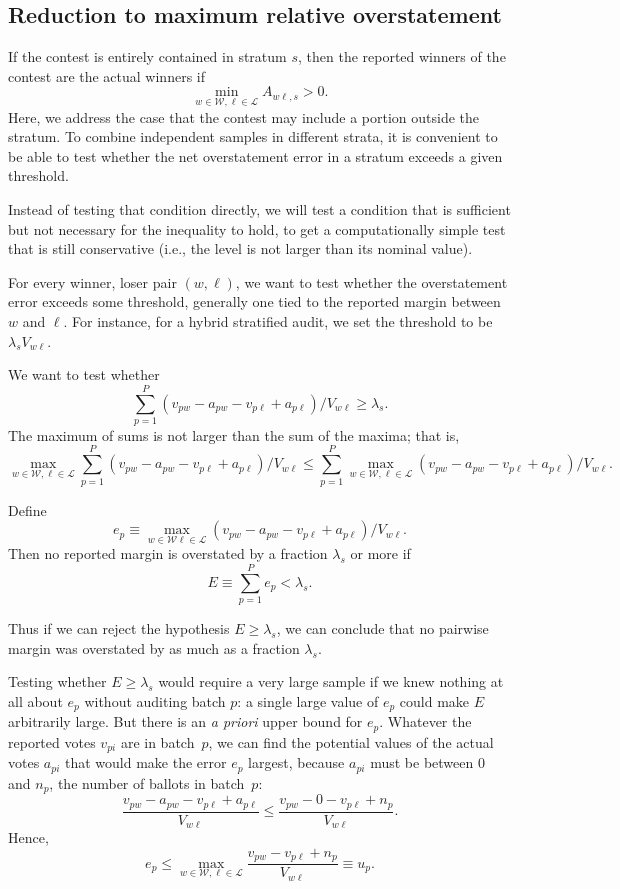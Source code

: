 \documentclass[runningheads]{llncs}
\begin{document}
\subsection{Reduction to maximum relative overstatement}
If the contest is entirely contained in stratum $s$, then
the reported winners of the contest are the actual winners if
$$ 
   \min_{w \in \mathcal{W}, \ell \in \mathcal{L}} A_{w\ell,s} > 0.
$$
Here, we address the case that the contest may include a portion outside the stratum.
To combine independent samples in different strata, it is convenient
to be able to test whether the net overstatement error in a stratum exceeds a given threshold.

Instead of testing that condition directly, we will test a condition that is sufficient 
but not necessary for the inequality to hold, to get a computationally simple test that
is still conservative (i.e., the level is not larger than its nominal value).

For every winner, loser pair $(w, \ell)$, we want to test
whether the overstatement error exceeds some threshold, generally
one tied to the reported margin between $w$ and $\ell$.
For instance, for a hybrid stratified audit, we set the threshold to be
$\lambda_s V_{w\ell}$.

We want to test whether
$$
   \sum_{p=1}^P (v_{pw}-a_{pw} - v_{p\ell} + a_{p\ell})/V_{w\ell} \ge \lambda_s.
$$
The maximum of sums is not larger than the sum of the maxima; that is,
$$
\max_{w \in \mathcal{W},  \ell \in \mathcal{L}}
   \sum_{p=1}^P (v_{pw}-a_{pw} - v_{p\ell} + a_{p\ell})/V_{w\ell}
   \le
  \sum_{p=1}^P  \max_{w \in \mathcal{W},  \ell \in \mathcal{L}} 
  (v_{pw}-a_{pw} - v_{p\ell} + a_{p\ell})/V_{w\ell}.
$$

Define 
$$
  e_p \equiv \max_{w \in \mathcal{W} \ell \in \mathcal{L}} 
     (v_{pw}-a_{pw} - v_{p\ell} + a_{p\ell})/V_{w\ell}.
$$
Then no reported margin is overstated by a fraction $\lambda_s$ or more
if 
$$ 
  E \equiv \sum_{p=1}^P e_p < \lambda_s.
$$

Thus if we can reject the hypothesis $E \ge \lambda_s$, we can conclude that
no pairwise margin was overstated by as much as a fraction $\lambda_s$.

Testing whether $E \ge \lambda_s$ would require a very large sample if we knew nothing at
all about $e_p$ without auditing batch $p$: a single large value of $e_p$ could make
$E$ arbitrarily large.
But there is an \emph{a priori} upper bound for $e_p$.
Whatever the reported votes $v_{pi}$ are in batch~$p$, we can find the
potential values of the actual votes $a_{pi}$ that would make the
error $e_p$ largest, because $a_{pi}$ must be between 0 and $n_p$,
the number of ballots in batch~$p$:
$$
    \frac{v_{pw}-a_{pw} - v_{p\ell} + a_{p\ell}}{V_{w\ell}} \le 
    \frac{v_{pw}- 0 - v_{p\ell} + n_p}{V_{w\ell}}.
$$
Hence,
\begin{equation} \label{eq:uDef}
    e_p \le \max_{w \in \mathcal{W}, \ell \in \mathcal{L}} 
    \frac{v_{pw} - v_{p\ell} + n_p}{V_{w\ell}} \equiv u_p.
\end{equation}
\end{document}
